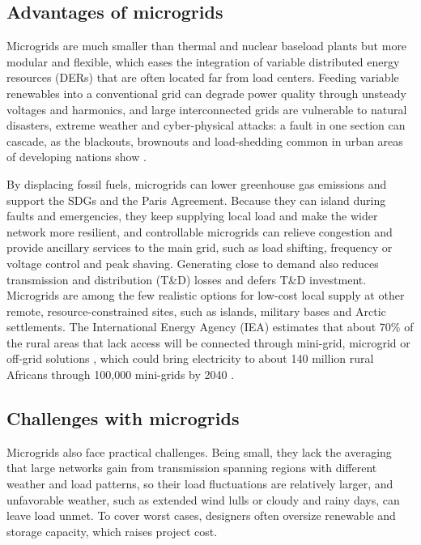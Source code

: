 \documentclass[final,3p,times]{elsarticle}
\begin{document}
\subsection{Advantages of microgrids}

Microgrids are much smaller than thermal and nuclear baseload plants but more modular and flexible, which eases the integration of variable distributed energy resources (DERs) that are often located far from load centers. Feeding variable renewables into a conventional grid can degrade power quality through unsteady voltages and harmonics, and large interconnected grids are vulnerable to natural disasters, extreme weather and cyber-physical attacks: a fault in one section can cascade, as the blackouts, brownouts and load-shedding common in urban areas of developing nations show \cite{macrogrid_prob}.

By displacing fossil fuels, microgrids can lower greenhouse gas emissions and support the SDGs and the Paris Agreement. Because they can island during faults and emergencies, they keep supplying local load and make the wider network more resilient, and controllable microgrids can relieve congestion and provide ancillary services to the main grid, such as load shifting, frequency or voltage control and peak shaving. Generating close to demand also reduces transmission and distribution (T\&D) losses and defers T\&D investment. Microgrids are among the few realistic options for low-cost local supply at other remote, resource-constrained sites, such as islands, military bases and Arctic settlements. The International Energy Agency (IEA) estimates that about 70\% of the rural areas that lack access will be connected through mini-grid, microgrid or off-grid solutions \cite{WEO_2018,mentis}, which could bring electricity to about 140 million rural Africans through 100,000 mini-grids by 2040 \cite{wri}.

\subsection{Challenges with microgrids \label{sec:MG_challenges}}

Microgrids also face practical challenges. Being small, they lack the averaging that large networks gain from transmission spanning regions with different weather and load patterns, so their load fluctuations are relatively larger, and unfavorable weather, such as extended wind lulls or cloudy and rainy days, can leave load unmet. To cover worst cases, designers often oversize renewable and storage capacity, which raises project cost.
\end{document}
